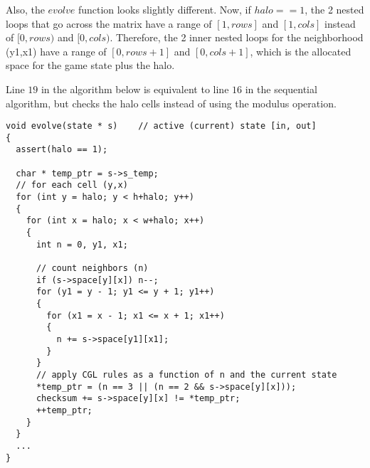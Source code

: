 \documentclass[a4paper,12pt,openany]{article}
\begin{document}
Also, the $evolve$ function looks slightly different.
Now, if $halo == 1$, the 2 nested loops that go across the matrix have a
range of $[1,rows]$ and $[1,cols]$ instead of $[0,rows)$ and $[0,cols)$.
Therefore, the 2 inner nested loops for the neighborhood (y1,x1) have a range
of $[0,rows+1]$ and $[0,cols+1]$, which is the allocated space for the
game state plus the halo.

Line $19$ in the algorithm below is equivalent to line $16$ in the sequential algorithm, but checks the halo cells instead of using the modulus operation.

\begin{lstlisting}
void evolve(state * s)    // active (current) state [in, out]
{
  assert(halo == 1);

  char * temp_ptr = s->s_temp;
  // for each cell (y,x)
  for (int y = halo; y < h+halo; y++)
  {
    for (int x = halo; x < w+halo; x++)
    {
      int n = 0, y1, x1;

      // count neighbors (n)
      if (s->space[y][x]) n--;
      for (y1 = y - 1; y1 <= y + 1; y1++)
      {
        for (x1 = x - 1; x1 <= x + 1; x1++)
        {
          n += s->space[y1][x1];
        }
      }
      // apply CGL rules as a function of n and the current state
      *temp_ptr = (n == 3 || (n == 2 && s->space[y][x]));
      checksum += s->space[y][x] != *temp_ptr;
      ++temp_ptr;
    }
  }
  ...
}
\end{lstlisting}
\end{document}
